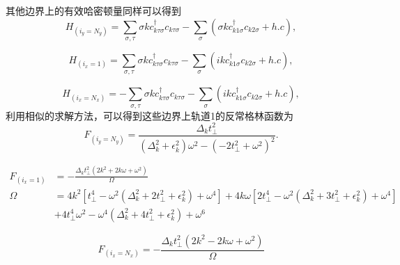其他边界上的有效哈密顿量同样可以得到
\begin{equation}
H_{(i_y=N_y)}=\sum_{\sigma,\tau}\sigma k c_{k\tau\sigma}^\dagger c_{k\tau\sigma}-\sum_\sigma(\sigma k c_{k1\sigma}^\dagger c_{k2\sigma}+h.c),\label{iyn}
\end{equation}

\begin{equation}
H_{(i_x=1)}=\sum_{\sigma,\tau}\sigma k c_{k\tau\sigma}^\dagger c_{k\tau\sigma}-\sum_\sigma(i k c_{k1\sigma}^\dagger c_{k2\sigma}+h.c),\label{ix1}
\end{equation}

\begin{equation}
H_{(i_x=N_x)}=-\sum_{\sigma,\tau}\sigma k c_{k\tau\sigma}^\dagger c_{k\tau\sigma}-\sum_\sigma(i k c_{k1\sigma}^\dagger c_{k2\sigma}+h.c),\label{ixn}
\end{equation}
利用相似的求解方法，可以得到这些边界上轨道1的反常格林函数为
\begin{equation}
F_{(i_y=N_y)}=\frac{\Delta_k t_\perp^2}{(\Delta_k^2+\epsilon_k^2)\omega^2-(-2t_\perp^2+\omega^2)^2}\label{cyyL}.
\end{equation}

\begin{equation}
\begin{aligned}
F_{(i_x=1)}&=-\frac{\Delta_k  t_\perp^2 \left(2 k^2+2 k \omega +\omega ^2\right)}{\Omega}\\
\Omega&=4 k^2 \left[t_\perp^4-\omega ^2 \left(\Delta_k ^2+2 t_\perp^2+\epsilon_k ^2\right)+\omega ^4\right]+4 k \omega  \left[2 t_\perp^4-\omega ^2 \left(\Delta_k ^2+3 t_\perp^2+\epsilon_k ^2\right)+\omega ^4\right]\\
&+4 t_\perp^4 \omega ^2-\omega ^4 \left(\Delta_k ^2+4 t_\perp^2+\epsilon_k ^2\right)+\omega ^6\label{cyxL}
\end{aligned}
\end{equation}
	
\begin{equation}
F_{(i_x=N_x)}=-\frac{\Delta_k  t_\perp^2 \left(2 k^2-2 k \omega +\omega ^2\right)}{\Omega}\label{cyx1}
\end{equation}

